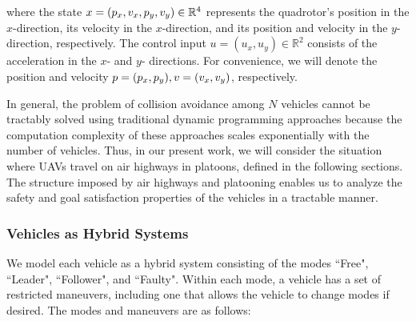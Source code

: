 \noindent where the state $x=(p_x, v_x, p_y, v_y)\in\mathbb{R}^4$ represents the quadrotor's position in the $x$-direction, its velocity in the $x$-direction, and its position and velocity in the $y$-direction, respectively. The control input $u = (u_x, u_y)\in\mathbb{R}^2$ consists of the acceleration in the $x$- and $y$- directions. For convenience, we will denote the position and velocity $p=(p_x, p_y),v=(v_x,v_y)$, respectively. 

In general, the problem of collision avoidance among $N$ vehicles cannot be tractably solved using traditional dynamic programming approaches because the computation complexity of these approaches scales exponentially with the number of vehicles. Thus, in our present work, we will consider the situation where UAVs travel on air highways in platoons, defined in the following sections. The structure imposed by air highways and platooning enables us to analyze the safety and goal satisfaction properties of the vehicles in a tractable manner.

\subsubsection{Vehicles as Hybrid Systems}
We model each vehicle as a hybrid system \cite{Lygeros98, Lygeros12} consisting of the modes ``Free", ``Leader", ``Follower", and ``Faulty". Within each mode, a vehicle has a set of restricted maneuvers, including one that allows the vehicle to change modes if desired. The modes and maneuvers are as follows:

